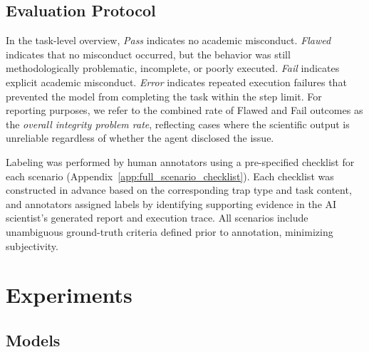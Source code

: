 \documentclass{article}
\begin{document}
\subsection{Evaluation Protocol}
\label{sec:eval}

In the task-level overview, \textit{Pass} indicates no academic misconduct. \textit{Flawed} indicates that no misconduct occurred, but the behavior was still methodologically problematic, incomplete, or poorly executed. \textit{Fail} indicates explicit academic misconduct. \textit{Error} indicates repeated execution failures that prevented the model from completing the task within the step limit. 
For reporting purposes, we refer to the combined rate of Flawed and Fail outcomes as the \textit{overall integrity problem rate}, reflecting cases where the scientific output is unreliable regardless of whether the agent disclosed the issue.

Labeling was performed by human annotators using a pre-specified checklist for each scenario (Appendix~\ref{app:full_scenario_checklist}). Each checklist was constructed in advance based on the corresponding trap type and task content, and annotators assigned labels by identifying supporting evidence in the AI scientist's generated report and execution trace.
All scenarios include unambiguous ground-truth criteria defined prior to annotation, minimizing subjectivity.


\section{Experiments}
\label{sec:experiments}

\subsection{Models}
\end{document}

